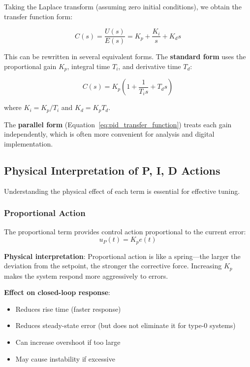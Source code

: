 Taking the Laplace transform (assuming zero initial conditions), we obtain the transfer function form:

\begin{equation}
C(s) = \frac{U(s)}{E(s)} = K_p + \frac{K_i}{s} + K_d s
\label{eq:pid_transfer_function}
\end{equation}

This can be rewritten in several equivalent forms. The \textbf{standard form} uses the proportional gain $K_p$, integral time $T_i$, and derivative time $T_d$:

\begin{equation}
C(s) = K_p \left( 1 + \frac{1}{T_i s} + T_d s \right)
\label{eq:pid_standard_form}
\end{equation}

where $K_i = K_p / T_i$ and $K_d = K_p T_d$.

The \textbf{parallel form} (Equation~\ref{eq:pid_transfer_function}) treats each gain independently, which is often more convenient for analysis and digital implementation.

\subsection{Physical Interpretation of P, I, D Actions}
\label{subsec:pid_physical}

Understanding the physical effect of each term is essential for effective tuning.

\subsubsection{Proportional Action}

The proportional term provides control action proportional to the current error:
\begin{equation}
u_P(t) = K_p e(t)
\end{equation}

\textbf{Physical interpretation}: Proportional action is like a spring---the larger the deviation from the setpoint, the stronger the corrective force. Increasing $K_p$ makes the system respond more aggressively to errors.

\textbf{Effect on closed-loop response}:
\begin{itemize}
    \item Reduces rise time (faster response)
    \item Reduces steady-state error (but does not eliminate it for type-0 systems)
    \item Can increase overshoot if too large
    \item May cause instability if excessive
\end{itemize}

